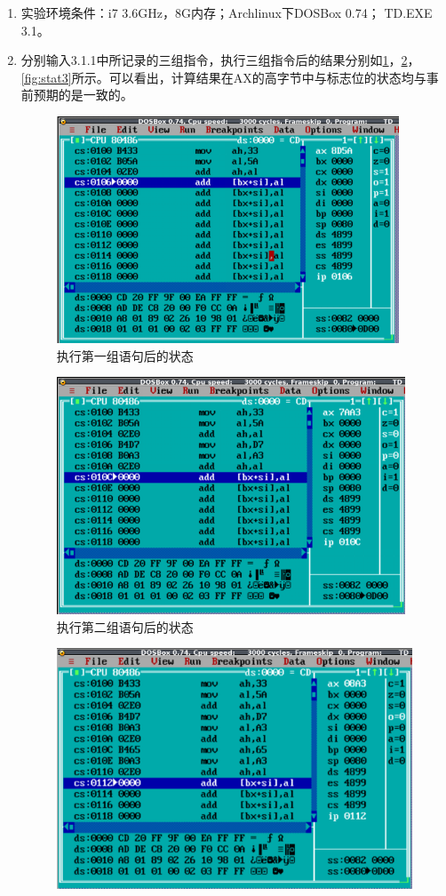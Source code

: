 \documentclass{article}
\begin{document}
	\begin{enumerate}
		\item 实验环境条件：i7 3.6GHz，8G内存；Archlinux下DOSBox 0.74； TD.EXE 3.1。
		\item 分别输入3.1.1中所记录的三组指令，执行三组指令后的结果分别如\ref{fig:stat1}，\ref{fig:stat2}，\ref{fig:stat3}所示。可以看出，计算结果在AX的高字节中与标志位的状态均与事前预期的是一致的。

			\begin{figure}[H]
				\centering
				\includegraphics[width=0.7\linewidth]{res/homework_1/fig1.png}
				\caption{执行第一组语句后的状态}
				\label{fig:stat1}
			\end{figure}
			\begin{figure}[H]
				\centering
				\includegraphics[width=0.7\linewidth]{res/homework_1/fig2.png}
				\caption{执行第二组语句后的状态}
				\label{fig:stat2}
			\end{figure}
			\begin{figure}[H]
				\centering
				\includegraphics[width=0.7\linewidth]{res/homework_1/fig3.png}

\end{figure}
\end{enumerate}
\end{document}
